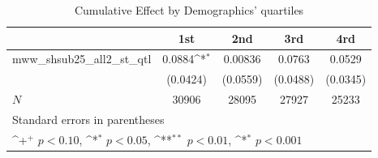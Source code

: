 \begin{table}[htbp]\centering
\def\sym#1{\ifmmode^{#1}\else\(^{#1}\)\fi}
\caption{Cumulative Effect by Demographics' quartiles}
\begin{tabular}{l*{4}{c}}
\hline\hline
            &\multicolumn{1}{c}{1st}&\multicolumn{1}{c}{2nd}&\multicolumn{1}{c}{3rd}&\multicolumn{1}{c}{4rd}\\
\hline
mww\_shsub25\_all2\_st\_qtl&      0.0884\sym{*}&     0.00836       &      0.0763       &      0.0529       \\
            &    (0.0424)       &    (0.0559)       &    (0.0488)       &    (0.0345)       \\
\hline
\(N\)       &       30906       &       28095       &       27927       &       25233       \\
\hline\hline
\multicolumn{5}{l}{\footnotesize Standard errors in parentheses}\\
\multicolumn{5}{l}{\footnotesize \sym{+} \(p<0.10\), \sym{*} \(p<0.05\), \sym{**} \(p<0.01\), \sym{*} \(p<0.001\)}\\
\end{tabular}
\end{table}
